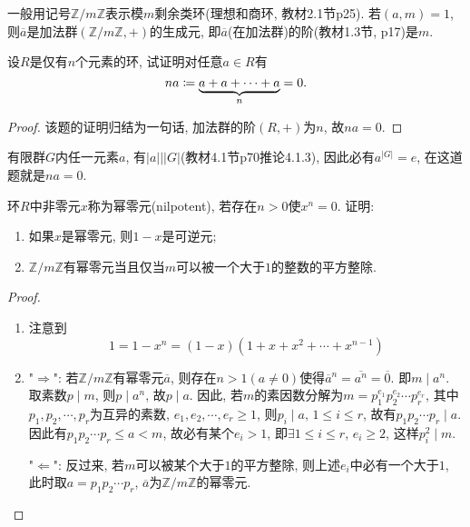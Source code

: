 \begin{remark}
    一般用记号$\mathbb{Z}/m\mathbb{Z}$表示模$m$剩余类环(理想和商环, 教材2.1节p25). 若$(a, m) = 1$, 则$\overline{a}$是加法群$(\mathbb{Z}/m\mathbb{Z}, +)$的生成元, 即$\overline{a}$(在加法群)的阶(教材1.3节, p17)是$m$.
\end{remark}

\begin{problem}
    设$R$是仅有$n$个元素的环, 试证明对任意$a \in R$有
    \[
        na \mathrel{\coloneqq} \underbrace{a + a + \cdots + a}_n = 0.
    \]
\end{problem}
    
\begin{proof}
    该题的证明归结为一句话, 加法群的阶$(R, +)$为$n$, 故$na = 0$.
\end{proof}

\begin{remark}
    有限群$G$内任一元素$a$, 有$|a| \big| |G|$(教材4.1节p70推论4.1.3), 因此必有$a^{|G|} = e$, 在这道题就是$na = 0$.
\end{remark}

\begin{problem}
    环$R$中非零元$x$称为幂零元(nilpotent), 若存在$n > 0$使$x^n = 0$. 证明:
    \begin{enumerate}[(1)]
        \item 如果$x$是幂零元, 则$1 - x$是可逆元;
        \item $\mathbb{Z}/m\mathbb{Z}$有幂零元当且仅当$m$可以被一个大于$1$的整数的平方整除.
    \end{enumerate}
\end{problem}

\begin{proof}
    \begin{enumerate}[(1)]
        \item 注意到
        \[
            1 = 1 - x^n = (1 - x)(1 + x + x^2 + \cdots + x^{n - 1})
        \]
        \item "$\Rightarrow$": 若$\mathbb{Z}/m\mathbb{Z}$有幂零元$\overline{a}$, 则存在$n > 1(a \neq 0)$使得$\overline{a}^n = \overline{a^n} = \overline{0}$. 即$m \mid a^n$. 取素数$p \mid m$, 则$p \mid a^n$, 故$p \mid a$. 因此, 若$m$的素因数分解为$m = p_1^{e_1}p_2^{e_2}\cdots p_r^{e_r}$, 其中$p_1, p_2, \cdots, p_r$为互异的素数, $e_1, e_2, \cdots, e_r \geqslant 1$, 则$p_i \mid a,\, 1 \leqslant i \leqslant r$, 故有$p_1p_2\cdots p_r \mid a$. 因此有$p_1p_2\cdots p_r \leqslant a < m$, 故必有某个$e_i > 1$, 即$\exists 1 \leqslant i \leqslant r$, $e_i \geqslant 2$, 这样$p_i^2 \mid m$.
        
        "$\Leftarrow$": 反过来, 若$m$可以被某个大于$1$的平方整除, 则上述$e_i$中必有一个大于$1$, 此时取$a = p_1p_2\cdots p_r$, $\overline{a}$为$\mathbb{Z}/m\mathbb{Z}$的幂零元.
    \end{enumerate}
\end{proof}


